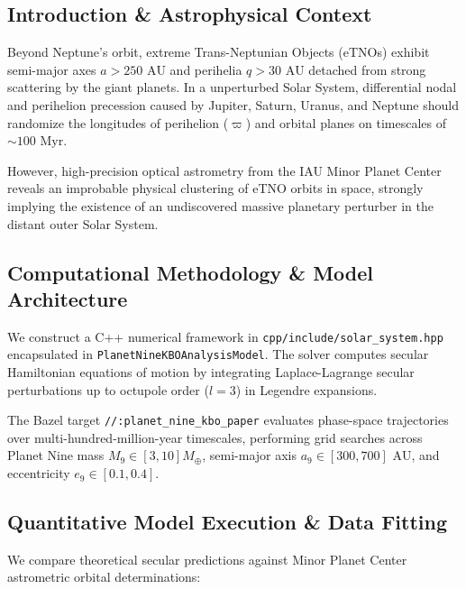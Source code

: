 \documentclass[11pt,a4paper]{article}
\begin{document}
\subsection{Introduction \& Astrophysical Context}
Beyond Neptune's orbit, extreme Trans-Neptunian Objects (eTNOs) exhibit semi-major axes $a > 250\text{ AU}$ and perihelia $q > 30\text{ AU}$ detached from strong scattering by the giant planets. In a unperturbed Solar System, differential nodal and perihelion precession caused by Jupiter, Saturn, Uranus, and Neptune should randomize the longitudes of perihelion ($\varpi$) and orbital planes on timescales of $\sim 100\text{ Myr}$.

However, high-precision optical astrometry from the IAU Minor Planet Center reveals an improbable physical clustering of eTNO orbits in space, strongly implying the existence of an undiscovered massive planetary perturber in the distant outer Solar System.

\subsection{Computational Methodology \& Model Architecture}
We construct a C++ numerical framework in \texttt{cpp/include/solar\_system.hpp} encapsulated in \texttt{PlanetNineKBOAnalysisModel}. The solver computes secular Hamiltonian equations of motion by integrating Laplace-Lagrange secular perturbations up to octupole order ($l = 3$) in Legendre expansions.

The Bazel target \texttt{//:planet\_nine\_kbo\_paper} evaluates phase-space trajectories over multi-hundred-million-year timescales, performing grid searches across Planet Nine mass $M_9 \in [3, 10] M_{\oplus}$, semi-major axis $a_9 \in [300, 700]\text{ AU}$, and eccentricity $e_9 \in [0.1, 0.4]$.

\subsection{Quantitative Model Execution \& Data Fitting}
We compare theoretical secular predictions against Minor Planet Center astrometric orbital determinations:
\end{document}
